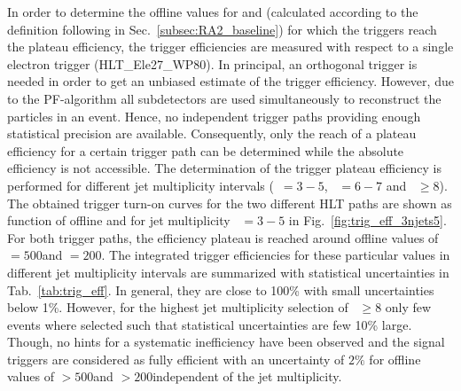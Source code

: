 In order to determine the offline values for \HT and \MHT (calculated according to the definition following in Sec.~\ref{subsec:RA2_baseline}) for which the triggers reach the plateau efficiency, the trigger efficiencies are measured with respect to a single electron trigger (HLT\_Ele27\_WP80). In principal, an orthogonal trigger is needed in order to get an unbiased estimate of the trigger efficiency. However, due to the PF-algorithm all subdetectors are used simultaneously to reconstruct the particles in an event. Hence, no independent trigger paths providing enough statistical precision are available. Consequently, only the reach of a plateau efficiency for a certain trigger path can be determined while the absolute efficiency is not accessible. The determination of the trigger plateau efficiency is performed for different jet multiplicity intervals (\NJets~$ = 3-5$, \NJets~$ = 6-7$ and \NJets~$ \ge 8$). The obtained trigger turn-on curves for the two different HLT paths are shown as function of offline \HT and \MHT for jet multiplicity \NJets~$ = 3-5$ in Fig.~\ref{fig:trig_eff_3njets5}. For both trigger paths, the efficiency plateau is reached around offline values of \HT$ = 500$\gev and \MHT$ = 200$\gev. The integrated trigger efficiencies for these particular values in different jet multiplicity intervals are summarized with statistical uncertainties in Tab.~\ref{tab:trig_eff}. In general, they are close to 100\% with small uncertainties below 1\%. However, for the highest jet multiplicity selection of \NJets~$ \ge 8$ only few events where selected such that statistical uncertainties are few 10\% large. Though, no hints for a systematic inefficiency have been observed and the signal triggers are considered as fully efficient with an uncertainty of $2\%$ for offline values of \HT$ > 500$\gev and \MHT$ > 200$\gev independent of the jet multiplicity. \\

